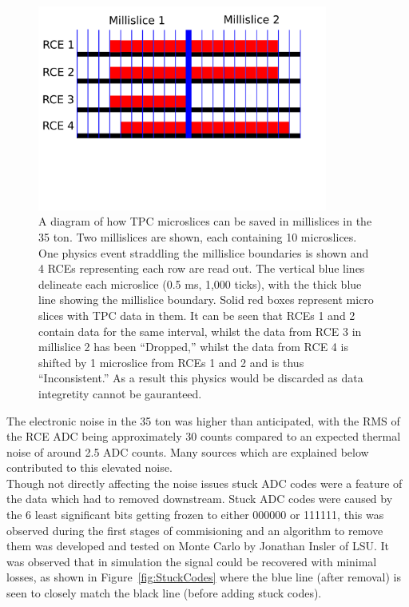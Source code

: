 \begin{figure}[h!]
  \centering
  \includegraphics[width=0.85\textwidth]{DataDrops}
  \caption[Dropped TPC data in the 35 ton]{A diagram of how TPC microslices can be saved in millislices in the 35 ton. Two millislices are shown, each containing 10 microslices. One physics event straddling the millislice boundaries is shown and 4 RCEs representing each row are read out. The vertical blue lines delineate each microslice (0.5 ms, 1,000 ticks), with the thick blue line showing the millislice boundary. Solid red boxes represent micro slices with TPC data in them. It can be seen that RCEs 1 and 2 contain data for the same interval, whilst the data from RCE 3 in millislice 2 has been ``Dropped,'' whilst the data from RCE 4 is shifted by 1 microslice from RCEs 1 and 2 and is thus ``Inconsistent.'' As a result this physics would be discarded as data integretity cannot be gauranteed.}
  \label{fig:DataDrops}
\end{figure}

The electronic noise in the 35 ton was higher than anticipated, with the RMS of the RCE ADC being approximately 30 counts compared to an expected thermal noise of around 2.5 ADC counts. Many sources which are explained below contributed to this elevated noise. \\

Though not directly affecting the noise issues stuck ADC codes were a feature of the data which had to removed downstream. Stuck ADC codes were caused by the 6 least significant bits getting frozen to either 000000 or 111111, this was observed during the first stages of commisioning and an algorithm to remove them was developed and tested on Monte Carlo by Jonathan Insler of LSU. It was observed that in simulation the signal could be recovered with minimal losses, as shown in Figure~\ref{fig:StuckCodes} where the blue line (after removal) is seen to closely match the black line (before adding stuck codes). \\


